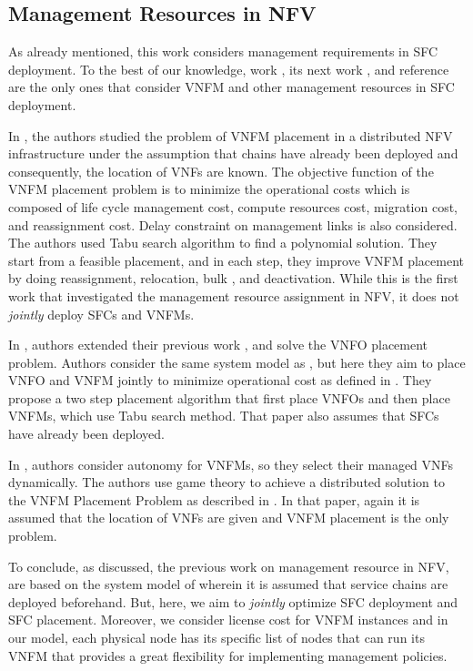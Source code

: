 \subsection{Management Resources in NFV}
As already mentioned, this work considers management requirements in SFC deployment. To the best of our knowledge, work \cite{AbuLebdeh2017}, its next work \cite{AbuLebdeh20172}, and reference \cite{Chiang2019} are the only ones that consider VNFM and other management resources in SFC deployment.

In \cite{AbuLebdeh2017}, the authors studied the problem of VNFM placement in a distributed NFV infrastructure under the assumption that chains have already been deployed and consequently, the location of VNFs are known.
The objective function of the VNFM placement problem is to minimize the operational costs which is composed of life cycle management cost, compute resources cost, migration cost, and reassignment cost. Delay constraint on management links is also considered. The authors used Tabu search algorithm 
to find a polynomial solution. They start from a feasible placement, and in each step, they improve VNFM placement by doing reassignment, relocation, bulk , and deactivation. While this is the first work that investigated the management resource assignment in NFV, it does not \textit{jointly} deploy SFCs and VNFMs. 

In \cite{AbuLebdeh20172}, authors extended their previous work \cite{AbuLebdeh2017}, and solve the VNFO placement problem.
Authors consider the same system model as \cite{AbuLebdeh2017}, but here they aim to place VNFO and VNFM jointly to  minimize operational cost as defined in \cite{AbuLebdeh2017}. They propose a two step placement algorithm that first place VNFOs and then place VNFMs, which use Tabu search method. That paper also assumes that SFCs have already been deployed.

In \cite{Chiang2019}, authors consider autonomy for VNFMs, so they select their managed VNFs dynamically. The authors use game theory to achieve a distributed solution to the VNFM Placement Problem as described in \cite{AbuLebdeh2017}. In that paper, again it is assumed that the location of VNFs are given and VNFM placement is the only problem.

To conclude, as discussed, the previous work on management resource in NFV, are based on the system model of \cite{AbuLebdeh2017} wherein it is assumed that service chains are deployed beforehand. But, here, we aim to \textit{jointly} optimize SFC deployment and SFC placement. Moreover, we consider license cost for VNFM instances and in our model, each physical node has its specific list of nodes that can run its VNFM that provides a great flexibility for implementing management policies.